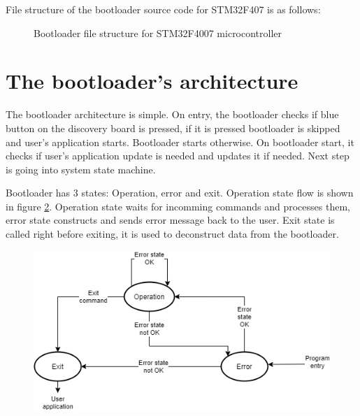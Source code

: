 File structure of the bootloader source code for STM32F407 is as follows:
\begin{figure}[H]
\caption{Bootloader file structure for STM32F4007 microcontroller}
\label{tree:bootloader}
\end{figure}

\section{The bootloader's architecture}

The bootloader architecture is simple. On entry, the bootloader checks if blue button on the discovery board is pressed, if it is pressed bootloader is skipped and user's application starts. Bootloader starts otherwise. On bootloader start, it checks if user's application update is needed and updates it if needed. Next step is going into system state machine.

Bootloader has 3 states: Operation, error and exit. Operation state flow is shown in figure \ref{fig:bootloader_flow}. Operation state waits for incomming commands and processes them, error state constructs and sends error message back to the user. Exit state is called right before exiting, it is used to deconstruct data from the bootloader.



\begin{figure}[H]
    \centering
    \includegraphics[width=.8\linewidth]{images/bootloader_flow.png}
    \label{fig:bootloader_flow}
\end{figure}

